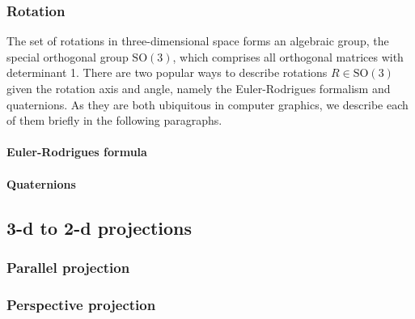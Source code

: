 \subsubsection{Rotation}
The set of rotations in three-dimensional space forms an algebraic group, the special orthogonal group $\mathrm{SO\left(3\right)}$,
which comprises all orthogonal matrices with determinant 1.
There are two popular ways to describe rotations $R \in \mathrm{SO\left(3\right)}$ given the rotation axis and angle, 
namely the Euler-Rodrigues formalism and quaternions. 
As they are both ubiquitous in computer graphics, we describe each of them briefly in the following paragraphs.

\paragraph{Euler-Rodrigues formula}


\paragraph{Quaternions}


\subsection{3-d to 2-d projections}

\subsubsection{Parallel projection}

\subsubsection{Perspective projection}

